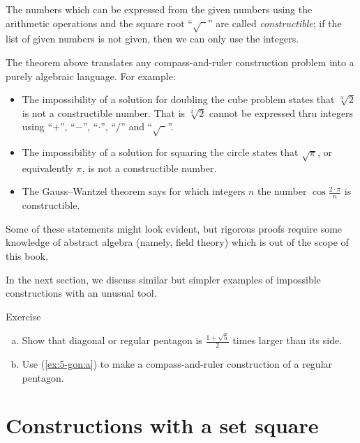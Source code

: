 The numbers which can be expressed from the given numbers using the arithmetic operations and the square root ``$\sqrt{\phantom{a}}$'' are called \emph{constructible};
if the list of given numbers is not given, then we can only use the integers.

{\sloppy
The theorem above translates any compass-and-ruler construction problem into a purely algebraic language.
For example:
\begin{itemize}
\item The impossibility of a solution for doubling the cube problem states that $\sqrt[3]{2}$ is not a constructible number.
That is $\sqrt[3]{2}$ cannot be expressed thru integers using
``$+$'', ``$-$'', ``$\cdot$'', ``$/$'' and ``$\sqrt{\phantom{a}}$''.

\item The impossibility of a solution for squaring the circle states that 
$\sqrt{\pi}$, or equivalently $\pi$, is not a constructible number.

\item The Gauss--Wantzel theorem says for which integers $n$ the number 
$\cos\tfrac{2\cdot\pi}n$ is constructible.
\end{itemize} 
Some of these statements might look evident, 
but rigorous proofs require some knowledge of abstract algebra (namely, field theory)
which is out of the scope of this book. 

}

In the next section, we discuss similar but simpler examples of impossible constructions with an unusual tool.

\begin{thm}{Exercise}\label{ex:5-gon}
\begin{enumerate}[(a)]
 \item\label{ex:5-gon:a} Show that diagonal or regular pentagon is $\tfrac{1+\sqrt5}2$ times larger than its side.
 \item\label{ex:5-gon:b} Use (\ref{ex:5-gon:a}) to make a compass-and-ruler construction of a regular pentagon.
\end{enumerate}
\end{thm}


\section*{Constructions with a set square}


